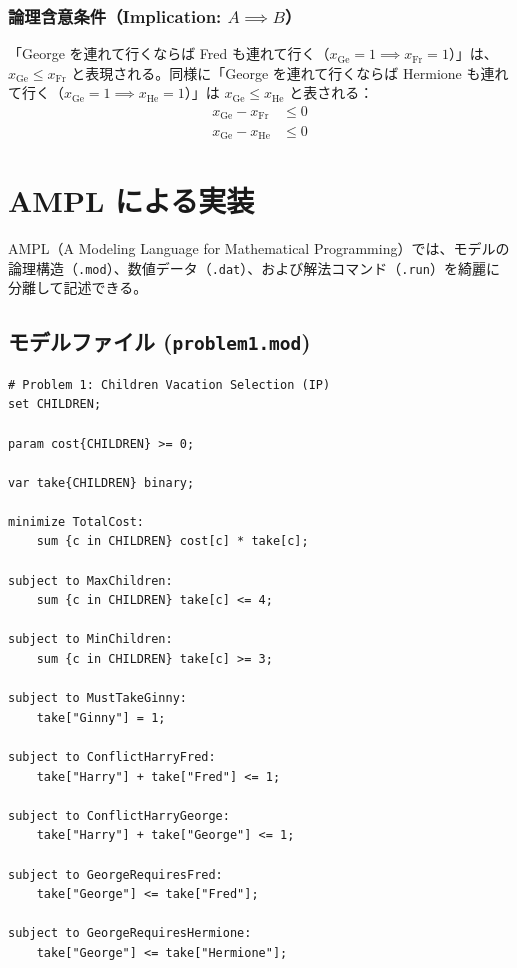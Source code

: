 \documentclass[11pt,a4paper]{ltjsarticle}
\begin{document}
\subsubsection{論理含意条件（Implication: $A \implies B$）}
「George を連れて行くならば Fred も連れて行く（$x_{\text{Ge}} = 1 \implies x_{\text{Fr}} = 1$）」は、
$x_{\text{Ge}} \le x_{\text{Fr}}$ と表現される。同様に「George を連れて行くならば Hermione も連れて行く（$x_{\text{Ge}} = 1 \implies x_{\text{He}} = 1$）」は
$x_{\text{Ge}} \le x_{\text{He}}$ と表される：
\begin{align}
  x_{\text{Ge}} - x_{\text{Fr}} &\le 0 \\
  x_{\text{Ge}} - x_{\text{He}} &\le 0
\end{align}

\section{AMPL による実装}

AMPL（A Modeling Language for Mathematical Programming）では、モデルの論理構造（\texttt{.mod}）、数値データ（\texttt{.dat}）、および解法コマンド（\texttt{.run}）を綺麗に分離して記述できる。

\subsection{モデルファイル (\texttt{problem1.mod})}
\begin{lstlisting}
# Problem 1: Children Vacation Selection (IP)
set CHILDREN;

param cost{CHILDREN} >= 0;

var take{CHILDREN} binary;

minimize TotalCost:
    sum {c in CHILDREN} cost[c] * take[c];

subject to MaxChildren:
    sum {c in CHILDREN} take[c] <= 4;

subject to MinChildren:
    sum {c in CHILDREN} take[c] >= 3;

subject to MustTakeGinny:
    take["Ginny"] = 1;

subject to ConflictHarryFred:
    take["Harry"] + take["Fred"] <= 1;

subject to ConflictHarryGeorge:
    take["Harry"] + take["George"] <= 1;

subject to GeorgeRequiresFred:
    take["George"] <= take["Fred"];

subject to GeorgeRequiresHermione:
    take["George"] <= take["Hermione"];
\end{lstlisting}
\end{document}
